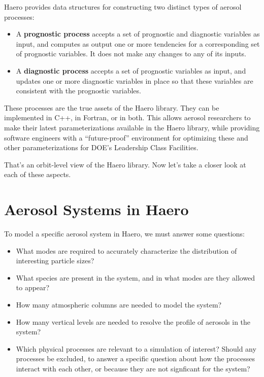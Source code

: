 Haero provides data structures for constructing two distinct types of aerosol
processes:

\begin{itemize}
  \item A {\bf prognostic process} accepts a set of prognostic and diagnostic
        variables as input, and computes as output one or more tendencies for a
        corresponding set of prognostic variables. It does not make any changes
        to any of its inputs.
  \item A {\bf diagnostic process} accepts a set of prognostic variables as
        input, and updates one or more diagnostic variables in place so that
        these variables are consistent with the prognostic variables.
\end{itemize}

These processes are the true assets of the Haero library. They can be
implemented in C++, in Fortran, or in both. This allows aerosol researchers to
make their latest parameterizations available in the Haero library, while
providing software engineers with a ``future-proof'' environment for optimizing
these and other parameterizations for DOE's Leadership Class Facilities.

That's an orbit-level view of the Haero library. Now let's take a closer look at
each of these aspects.

\section{Aerosol Systems in Haero}

To model a specific aerosol system in Haero, we must answer some questions:

\begin{itemize}
  \item What modes are required to accurately characterize the distribution of
        interesting particle sizes?
  \item What species are present in the system, and in what modes are they
        allowed to appear?
  \item How many atmospheric columns are needed to model the system?
  \item How many vertical levels are needed to resolve the profile of aerosols
        in the system?
  \item Which physical processes are relevant to a simulation of interest?
        Should any processes be excluded, to answer a specific question about
        how the processes interact with each other, or because they are not
        signficant for the system?
\end{itemize}

